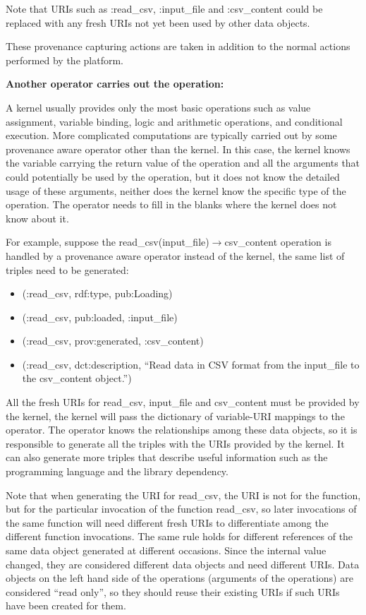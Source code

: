 Note that URIs such as :read\_csv, :input\_file and :csv\_content could be replaced with any fresh URIs not yet been used by other data objects.

These provenance capturing actions are taken in addition to the normal actions performed by the platform.

\noindent\textbf{Another operator carries out the operation:}

A kernel usually provides only the most basic operations such as value assignment, variable binding, logic and arithmetic operations, and conditional execution. More complicated computations are typically carried out by some provenance aware operator other than the kernel. In this case, the kernel knows the variable carrying the return value of the operation and all the arguments that could potentially be used by the operation, but it does not know the detailed usage of these arguments, neither does the kernel know the specific type of the operation. The operator needs to fill in the blanks where the kernel does not know about it.

For example, suppose the read\_csv(input\_file)$\rightarrow$csv\_content operation is handled by a provenance aware operator instead of the kernel, the same list of triples need to be generated:
\begin{itemize}
	\item (:read\_csv, rdf:type, pub:Loading)
	\item (:read\_csv, pub:loaded, :input\_file)
	\item (:read\_csv, prov:generated, :csv\_content)
	\item (:read\_csv, dct:description, ``Read data in CSV format from the input\_file to the csv\_content object.'')
\end{itemize}
All the fresh URIs for read\_csv, input\_file and csv\_content must be provided by the kernel, the kernel will pass the dictionary of variable-URI mappings to the operator. The operator knows the relationships among these data objects, so it is responsible to generate all the triples with the URIs provided by the kernel. It can also generate more triples that describe useful information such as the programming language and the library dependency.

Note that when generating the URI for read\_csv, the URI is not for the function, but for the particular invocation of the function read\_csv, so later invocations of the same function will need different fresh URIs to differentiate among the different function invocations. The same rule holds for different references of the same data object generated at different occasions. Since the internal value changed, they are considered different data objects and need different URIs. Data objects on the left hand side of the operations (arguments of the operations) are considered ``read only'', so they should reuse their existing URIs if such URIs have been created for them.

